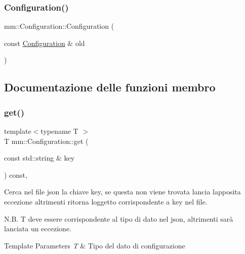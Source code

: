\subsubsection{\texorpdfstring{Configuration()}{Configuration()}}
{\footnotesize\ttfamily mm\+::\+Configuration\+::\+Configuration (\begin{DoxyParamCaption}\item[{const \mbox{\hyperlink{classmm_1_1_configuration}{Configuration}} \&}]{old }\end{DoxyParamCaption})\hspace{0.3cm}{\ttfamily [delete]}}



\subsection{Documentazione delle funzioni membro}
\mbox{\label{classmm_1_1_configuration_a30374c407050b9fb3f05dd3c2c01202d}} 
\subsubsection{\texorpdfstring{get()}{get()}}
{\footnotesize\ttfamily template$<$typename T $>$ \\
T mm\+::\+Configuration\+::get (\begin{DoxyParamCaption}\item[{const std\+::string \&}]{key }\end{DoxyParamCaption}) const\hspace{0.3cm}{\ttfamily [inline]}, {\ttfamily [noexcept]}}



Cerca nel file json la chiave {\ttfamily key}, se questa non viene trovata lancia l\textquotesingle{}apposita eccezione altrimenti ritorna l\textquotesingle{}oggetto corrispondente a {\ttfamily key} nel file. 

N.\+B. {\ttfamily T} deve essere corrispondente al tipo di dato nel json, altrimenti sarà lanciata un eccezione.


\begin{DoxyTemplParams}{Template Parameters}
{\em T} & Tipo del dato di configurazione \\
\hline
\end{DoxyTemplParams}

